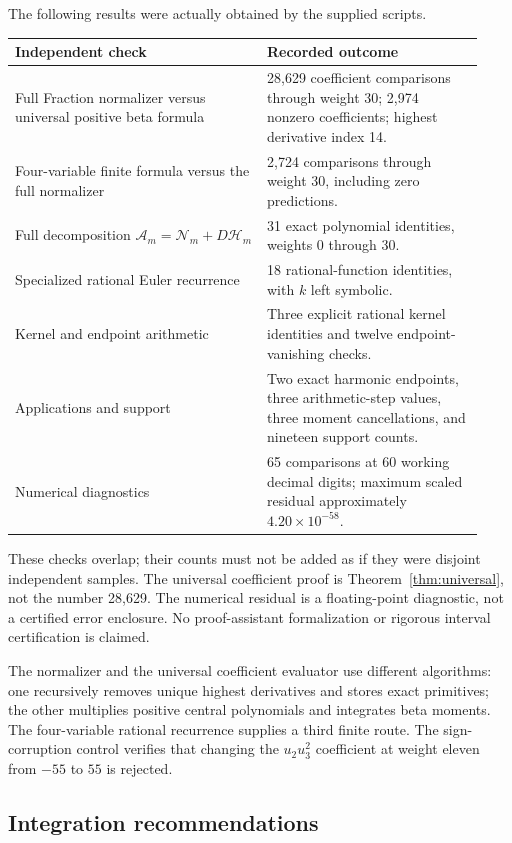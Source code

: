 \documentclass[11pt,letterpaper]{article}
\numberwithin{equation}{section}
\theoremstyle{plain}
\theoremstyle{definition}
\theoremstyle{remark}
\newcommand{\Ac}{\mathcal A}\newcommand{\Nc}{\mathcal N}\newcommand{\Hc}{\mathcal H}
\begin{document}
The following results were actually obtained by the supplied scripts.

\begin{center}
\small
\begin{tabular}{@{}p{0.50\linewidth}p{0.43\linewidth}@{}}
\toprule
Independent check & Recorded outcome\\
\midrule
Full Fraction normalizer versus universal positive beta formula & 28,629 coefficient comparisons through weight 30; 2,974 nonzero coefficients; highest derivative index 14.\\[4pt]
Four-variable finite formula versus the full normalizer & 2,724 comparisons through weight 30, including zero predictions.\\[4pt]
Full decomposition $\Ac_m=\Nc_m+D\Hc_m$ & 31 exact polynomial identities, weights 0 through 30.\\[4pt]
Specialized rational Euler recurrence & 18 rational-function identities, with $k$ left symbolic.\\[4pt]
Kernel and endpoint arithmetic & Three explicit rational kernel identities and twelve endpoint-vanishing checks.\\[4pt]
Applications and support & Two exact harmonic endpoints, three arithmetic-step values, three moment cancellations, and nineteen support counts.\\[4pt]
Numerical diagnostics & 65 comparisons at 60 working decimal digits; maximum scaled residual approximately $4.20\times10^{-58}$.\\
\bottomrule
\end{tabular}
\end{center}

These checks overlap; their counts must not be added as if they were disjoint independent samples. The universal coefficient proof is Theorem~\ref{thm:universal}, not the number 28,629. The numerical residual is a floating-point diagnostic, not a certified error enclosure. No proof-assistant formalization or rigorous interval certification is claimed.

The normalizer and the universal coefficient evaluator use different algorithms: one recursively removes unique highest derivatives and stores exact primitives; the other multiplies positive central polynomials and integrates beta moments. The four-variable rational recurrence supplies a third finite route. The sign-corruption control verifies that changing the $u_2u_3^2$ coefficient at weight eleven from $-55$ to $55$ is rejected.

\subsection{Integration recommendations}
\end{document}
